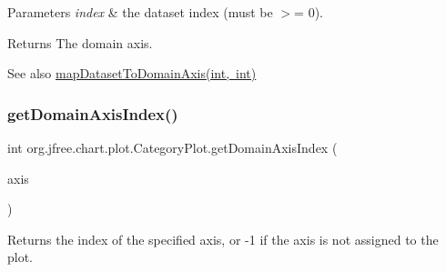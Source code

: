 \begin{DoxyParams}{Parameters}
{\em index} & the dataset index (must be $>$= 0).\\
\hline
\end{DoxyParams}
\begin{DoxyReturn}{Returns}
The domain axis.
\end{DoxyReturn}
\begin{DoxySeeAlso}{See also}
\mbox{\hyperlink{classorg_1_1jfree_1_1chart_1_1plot_1_1_category_plot_acd6ce8e64e718ebc15642ca578012c26}{map\+Dataset\+To\+Domain\+Axis(int, int)}} 
\end{DoxySeeAlso}
\mbox{\label{classorg_1_1jfree_1_1chart_1_1plot_1_1_category_plot_a1d89a58f4537d598f6eaec10a7b12516}} 
\subsubsection{\texorpdfstring{get\+Domain\+Axis\+Index()}{getDomainAxisIndex()}}
{\footnotesize\ttfamily int org.\+jfree.\+chart.\+plot.\+Category\+Plot.\+get\+Domain\+Axis\+Index (\begin{DoxyParamCaption}\item[{\mbox{\hyperlink{classorg_1_1jfree_1_1chart_1_1axis_1_1_category_axis}{Category\+Axis}}}]{axis }\end{DoxyParamCaption})}

Returns the index of the specified axis, or {\ttfamily -\/1} if the axis is not assigned to the plot.


